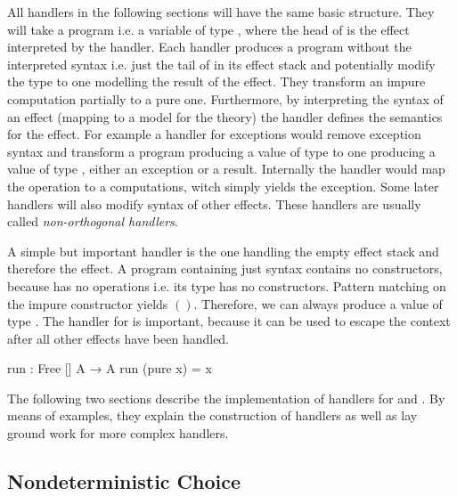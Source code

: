All handlers in the following sections will have the same basic structure.
They will take a program i.e. a variable of type
\AgdaSpace{}\AgdaSpace{},
where the head of  is the effect interpreted by the handler.
Each handler produces a program without the interpreted syntax i.e. just the
tail of  in its effect stack and potentially modify the type
 to one modelling the result of the effect.
They transform an impure computation partially to a pure one.
Furthermore, by interpreting the syntax of an effect (mapping to a model for
the theory) the handler defines the semantics for the effect.
For example a handler for exceptions would remove exception syntax and transform
a program producing a value of type  to one producing a value of
type \AgdaSpace{}\AgdaSpace{},
either an exception or a result.
Internally the handler would map the 
 operation to a 
computations, witch simply yields the exception.
Some later handlers will also modify syntax of other effects.
These handlers are usually called \textit{non-orthogonal handlers}.

A simple but important handler is the one handling the empty effect stack and
therefore the  effect.
A program containing just  syntax contains no
 constructors, because  has
no operations i.e. its  type has no constructors.
Pattern matching on the impure constructor yields $()$.
Therefore, we can always produce a value of type .
The handler for  is important, because it can be used to
escape the  context after all other effects have been
handled.

\begin{code}
run : Free [] A → A
run (pure x) = x
\end{code}

The following two sections describe the implementation of handlers for
 and .
By means of examples, they explain the construction of handlers as well as
lay ground work for more complex handlers.


\subsection{Nondeterministic Choice}
\label{nondeterminism}


